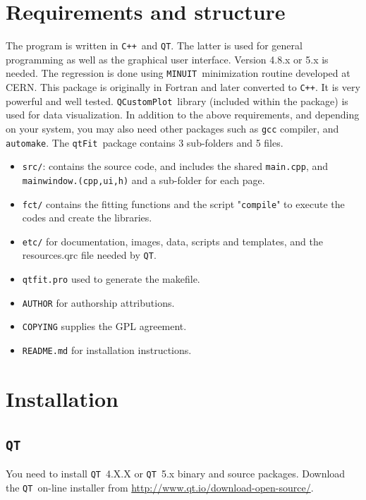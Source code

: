 \documentclass[10pt,letterpaper,oneside]{article}
\newcommand{\cpp}{\texttt{C++}}
\newcommand{\qt}{\texttt{QT}}
\newcommand{\minuit}{\texttt{MINUIT}}
\newcommand{\name}{\texttt{qtFit}}
\newcommand{\qcp}{\texttt{QCustomPlot}}
\begin{document}

 \section{Requirements and structure}
The program is written in \cpp\ and \qt. The latter is used for general programming as well as the graphical user interface.  Version 4.8.x or 5.x is needed. The regression is done using \minuit\ minimization routine developed
at CERN. This package is originally in Fortran and later converted to \cpp. 
It is very powerful and well tested. \qcp\ library (included within the package) is used for data visualization. In addition to the above requirements, and depending on your system, you may also need other packages such as \texttt{gcc} compiler, and \texttt{automake}. The \name\ package contains 3 sub-folders and 5 files.
\begin{itemize}
 \item \verb+src/+: contains the source code, and includes the shared \verb+main.cpp+, and 
 \verb+mainwindow.(cpp,ui,h)+ and a sub-folder for each page.
 \item \verb+fct/+ contains the fitting functions and the script "\verb+compile+"
 to execute the codes and create the libraries.
 \item \verb+etc/+ for documentation, images, data, scripts
and templates, and the resources.qrc file needed by \qt.
 \item \verb+qtfit.pro+ used to generate the makefile.
 \item  \verb+AUTHOR+ for authorship attributions.
 \item \verb+COPYING+ supplies the GPL agreement.
 \item \verb+README.md+ for installation instructions.
 \end{itemize}


\section{Installation}
\subsection{\qt}
You need to install \qt\ 4.X.X or \qt\ 5.x binary and source packages.
Download the \qt\ on-line installer from \url{http://www.qt.io/download-open-source/}. 
\end{document}
